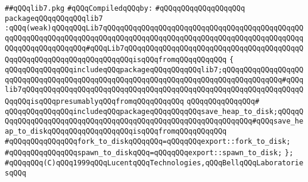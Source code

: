 \label{src/lib/std/lib7.pkg}
\verb|##qQQqlib7.pkg|\newline
\newline
\verb|#qQQqCompiledqQQqby:|\newline
\verb|#qQQqqQQqqQQqqQQqqQQq|\newline
\newline
\verb|packageqQQqqQQqqQQqlib7|\newline
\verb|:qQQq(weak)qQQqqQQqLib7qQQqqQQqqQQqqQQqqQQqqQQqqQQqqQQqqQQqqQQqqQQqqQQqqQQqqQQqqQQqqQQqqQQqqQQqqQQqqQQqqQQqqQQqqQQqqQQqqQQqqQQqqQQqqQQqqQQqqQQqqQQqqQQqqQQqqQQq#qQQqLib7qQQqqQQqqQQqqQQqqQQqqQQqqQQqqQQqqQQqqQQqqQQqqQQqqQQqqQQqqQQqqQQqqQQqqQQqisqQQqfromqQQqqQQqqQQq|\newline
\verb|{|\newline
\verb|qQQqqQQqqQQqqQQqincludeqQQqpackageqQQqqQQqqQQqlib7;qQQqqQQqqQQqqQQqqQQqqQQqqQQqqQQqqQQqqQQqqQQqqQQqqQQqqQQqqQQqqQQqqQQqqQQqqQQqqQQqqQQq#qQQqlib7qQQqqQQqqQQqqQQqqQQqqQQqqQQqqQQqqQQqqQQqqQQqqQQqqQQqqQQqqQQqqQQqqQQqqQQqisqQQqpresumablyqQQqfromqQQqqQQqqQQq|\newline
\verb|qQQqqQQqqQQqqQQq#|\newline
\verb|qQQqqQQqqQQqqQQqincludeqQQqpackageqQQqqQQqqQQqsave_heap_to_disk;qQQqqQQqqQQqqQQqqQQqqQQqqQQqqQQqqQQqqQQqqQQqqQQqqQQqqQQqqQQqqQQq#qQQqsave_heap_to_diskqQQqqQQqqQQqqQQqqQQqisqQQqfromqQQqqQQqqQQq|\newline
\verb|#qQQqqQQqqQQqqQQqfork_to_diskqQQqqQQq=qQQqqQQqexport::fork_to_disk;|\newline
\verb|#qQQqqQQqqQQqqQQqspawn_to_diskqQQq=qQQqqQQqexport::spawn_to_disk;|\newline
\verb|};|\newline
\newline
\newline
\verb|#qQQqqQQq(C)qQQq1999qQQqLucentqQQqTechnologies,qQQqBellqQQqLaboratoriesqQQq|\newline

